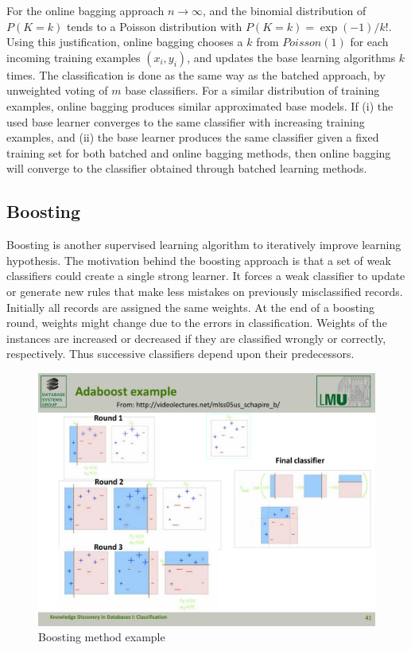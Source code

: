 For the online bagging approach $n \rightarrow \infty$, and the binomial distribution of $P(K=k)$ tends to a Poisson distribution with $P(K=k) = \exp(-1)/k!$. Using this justification, online bagging chooses a $k $ from $Poisson(1)$ for each incoming training examples $(x_i, y_i)$, and updates the base learning algorithms $k$ times. The classification is done as the same way as the batched approach, by unweighted voting of $m$ base classifiers. For a similar distribution of training examples, online bagging produces similar approximated base models. If (i) the used base learner converges to the same classifier with increasing training examples, and (ii) the base learner produces the same classifier given a fixed training set for both batched and online bagging methods, then online bagging will converge to the classifier obtained through batched learning methods.


\subsection{Boosting}
Boosting is another supervised learning algorithm to iteratively improve learning hypothesis. The motivation behind the boosting approach is that a set of weak classifiers could create a single strong learner. It forces a weak classifier to update or generate new rules that make less mistakes on previously misclassified records. Initially all records are assigned the same weights. At the end of a boosting round, weights might change due to the errors in classification. Weights of the instances are increased or decreased if they are classified wrongly or correctly, respectively. Thus successive classifiers depend upon their predecessors. 
\begin{figure}[htbp]
    \begin{center}
        \includegraphics[width=12.0cm]{figs/boosting.pdf}
        \caption{Boosting method example}
        \label{fig:bg:bosting}
    \end{center}
\end{figure}

